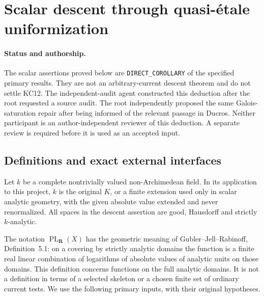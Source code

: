 \section{Scalar descent through quasi-\'etale uniformization}
\label{sec:r24-harmonic-uniformization}

\paragraph{Status and authorship.}
The scalar assertions proved below are \texttt{DIRECT\_COROLLARY} of the
specified primary results.  They are not an arbitrary-current descent
theorem and do not settle KC12.  The independent-audit agent constructed
this deduction after the root requested a source audit.  The root
independently proposed the same Galois-saturation repair after being
informed of the relevant passage in Ducros.  Neither participant is an
author-independent reviewer of this deduction.  A separate review is
required before it is used as an accepted input.

\subsection{Definitions and exact external interfaces}

Let $k$ be a complete nontrivially valued non-Archimedean field.  In its
application to this project, $k$ is the original $K$, or a finite
extension used only in scalar analytic geometry, with the given
absolute value extended and never renormalized.  All spaces in the
descent assertion are good, Hausdorff and strictly $k$-analytic.

The notation $\operatorname{PL}_{\mathbf R}(X)$ has the geometric
meaning of Gubler--Jell--Rabinoff, Definition~5.1: on a covering by
strictly analytic domains the function is a finite real linear
combination of logarithms of absolute values of analytic units on
those domains.  This definition concerns functions on the full
analytic domains.  It is not a definition in terms of a selected
skeleton or a chosen finite set of ordinary current tests.  We use
the following primary inputs, with their original hypotheses.

